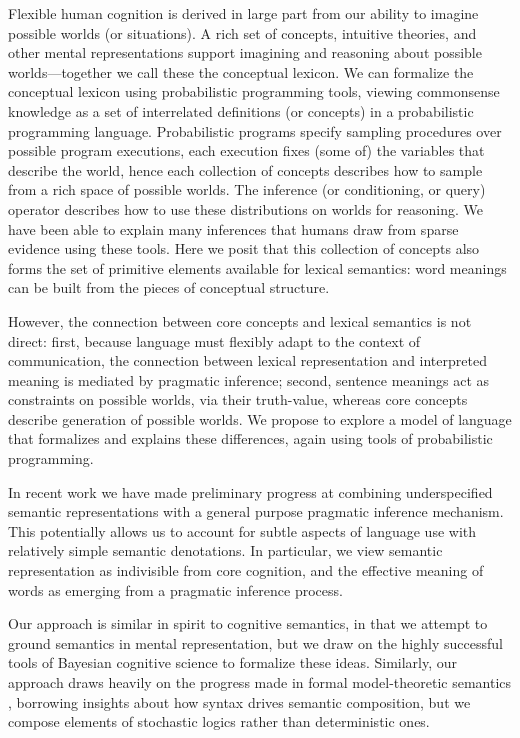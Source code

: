 \documentclass[12pt]{article}
\begin{document}
Flexible human cognition is derived in large part from our ability to imagine possible worlds (or situations). 
A rich set of concepts, intuitive theories, and other mental representations support imagining and reasoning about possible worlds---together we call these the conceptual lexicon. 
%
We can formalize the conceptual lexicon using probabilistic programming tools, viewing commonsense knowledge as a set of interrelated definitions (or concepts) in a probabilistic programming language. 
Probabilistic programs specify sampling procedures over possible program executions, each execution fixes (some of) the variables that describe the world, hence each collection of concepts describes how to sample from a rich space of possible worlds. 
The inference (or conditioning, or query) operator describes how to use these distributions on worlds for reasoning. 
%
We have been able to explain many inferences that humans draw from sparse evidence using these tools. 
Here we posit that this collection of concepts also forms the set of primitive elements available for lexical semantics: word meanings can be built from the pieces of conceptual structure.

However, the connection between core concepts and lexical semantics is not direct: 
first, because language must flexibly adapt to the context of communication, the connection between lexical representation and interpreted meaning is mediated by pragmatic inference;
second, sentence meanings act as constraints on possible worlds, via their truth-value, whereas core concepts describe generation of possible worlds.
We propose to explore a model of language that formalizes and explains these differences, again using tools of probabilistic programming. 

In recent work we have made preliminary progress at combining underspecified semantic representations with a general purpose pragmatic inference mechanism.
This potentially allows us to account for subtle aspects of language use with relatively simple semantic denotations.
In particular, we view semantic representation as indivisible from core cognition, and the effective meaning of words as emerging from a pragmatic inference process. 

Our approach is similar in spirit to cognitive semantics, in that we attempt to ground semantics in mental representation, but we draw on the highly successful tools of Bayesian cognitive science to formalize these ideas. 
Similarly, our approach draws heavily on the progress made in formal model-theoretic semantics \cite{montague1973,heimkratzer1998}, borrowing insights about how syntax drives semantic composition, but we compose elements of stochastic logics rather than deterministic ones.
\end{document}
